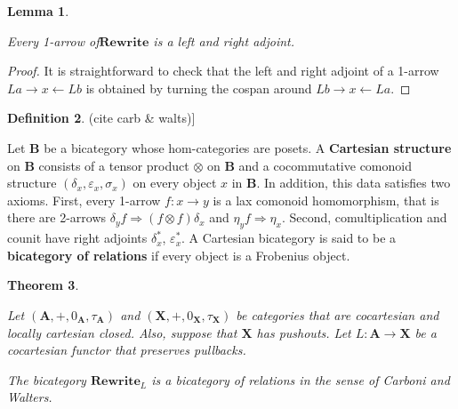 \documentclass{amsart}
\renewcommand{\epsilon}{\varepsilon}
\newcommand{\A}{\cat{A}}
\newcommand{\X}{\cat{X}}
\newcommand{\defn}[1]{\textbf{#1}}
\newcommand{\cat}[1]{\mathbf{#1}}
\newcommand{\from}{\colon}
\newcommand{\Rewrite}{\mathbf{Rewrite} }
\newcommand{\edit}[1]{\textcolor{editcolour}{(#1)}}
\newtheorem{theorem}{Theorem}[section]
\newtheorem{lemma}[theorem]{Lemma}
\theoremstyle{remark}
\theoremstyle{definition}
\newtheorem{definition}[theorem]{Definition}
\begin{document}
\begin{lemma} \label{thm:bicat-rewr-arrows-dual}
  
  Every 1-arrow of$ \Rewrite $ is a left and right adjoint.
  
\end{lemma}

\begin{proof}
  
  It is straightforward to check that the left and right adjoint of a
  1-arrow $ La \to x \gets Lb $ is obtained by turning the cospan
  around $ Lb \to x \gets La $.
  
\end{proof}

\begin{definition}\edit{cite carb \& walts}] \label{def:bicat-rels}

  Let $ \cat{B} $ be a bicategory whose hom-categories are posets. A
  \defn{Cartesian structure} on $ \cat{B} $ consists of a tensor
  product $ \otimes $ on $ \cat{B} $ and a cocommutative comonoid
  structure $ (\delta_x , \epsilon_x , \sigma_x ) $ on every object
  $ x $ in $ \cat{B} $.  In addition, this data satisfies two
  axioms. First, every 1-arrow $ f \from x \to y $ is a lax comonoid
  homomorphism, that is there are 2-arrows
  $ \delta_y f \Rightarrow (f \otimes f) \delta_x $ and
  $ \eta_y f \Rightarrow \eta_x $. Second, comultiplication and counit
  have right adjoints $ \delta^\ast_x $, $ \epsilon^\ast_x $. A
  Cartesian bicategory is said to be a \defn{bicategory of relations}
  if every object is a Frobenius object.
  
 \end{definition}

\begin{theorem} \label{thm:bicat-rewr-bicat-rel}

   Let $ (\A , + , 0_\A , \tau_\A ) $ and
   $ (\X , + , 0_\X , \tau_\X ) $ be categories that are cocartesian
   and locally cartesian closed. Also, suppose that $ \X $ has
   pushouts. Let $ L \from \A \to \X $ be a cocartesian functor that
   preserves pullbacks.
 	
   The bicategory $ \Rewrite_{L} $ is a bicategory of relations in the
   sense of Carboni and Walters.
   
\end{theorem}
\end{document}
